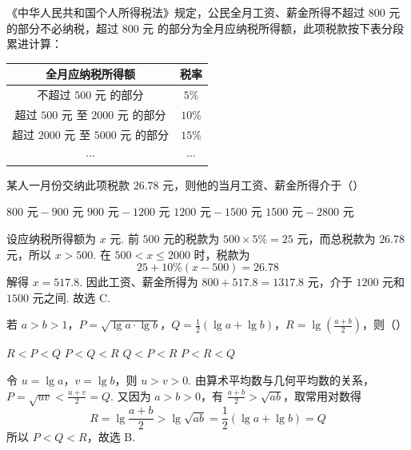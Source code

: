 \begin{problem}
《中华人民共和国个人所得税法》规定，公民全月工资、薪金所得不超过 \(800\text{ 元}\) 的部分不必纳税，超过 \(800\text{ 元}\) 的部分为全月应纳税所得额，此项税款按下表分段累进计算：

\begin{center}
\begin{tabular}{|c|c|}
\hline
全月应纳税所得额 & 税率 \\
\hline
不超过 \(500\text{ 元}\) 的部分 & \(5\%\) \\
\hline
超过 \(500\text{ 元}\) 至 \(2000\text{ 元}\) 的部分 & \(10\%\) \\
\hline
超过 \(2000\text{ 元}\) 至 \(5000\text{ 元}\) 的部分 & \(15\%\) \\
\hline
\(\cdots\) & \(\cdots\) \\
\hline
\end{tabular}
\end{center}

某人一月份交纳此项税款 \(26.78\text{ 元}\)，则他的当月工资、薪金所得介于（\quad）

\choices
    {\(800\text{ 元}-900\text{ 元}\)}
    {\(900\text{ 元}-1200\text{ 元}\)}
    {\(1200\text{ 元}-1500\text{ 元}\)}
    {\(1500\text{ 元}-2800\text{ 元}\)}


\begin{solution}
设应纳税所得额为 \(x\) 元. 前 \(500\) 元的税款为 \(500\times5\%=25\) 元，而总税款为 \(26.78\) 元，所以 \(x>500\). 在 \(500<x\leqslant2000\) 时，税款为
\[
25+10\%(x-500)=26.78
\]
解得 \(x=517.8\). 因此工资、薪金所得为 \(800+517.8=1317.8\) 元，介于 \(1200\) 元和 \(1500\) 元之间. 故选 C.
\end{solution}
\end{problem}

\begin{problem}
若 \(a>b>1\)，\(P=\sqrt{\lg a\cdot\lg b}\)，\(Q=\frac{1}{2}\left(\lg a+\lg b\right)\)，\(R=\lg\left(\frac{a+b}{2}\right)\)，则（\quad）

\choices
    {\(R<P<Q\)}
    {\(P<Q<R\)}
    {\(Q<P<R\)}
    {\(P<R<Q\)}


\begin{solution}
令 \(u=\lg a\)，\(v=\lg b\)，则 \(u>v>0\). 由算术平均数与几何平均数的关系，\(P=\sqrt{uv}<\frac{u+v}{2}=Q\). 又因为 \(a>b>0\)，有 \(\frac{a+b}{2}>\sqrt{ab}\)，取常用对数得
\[
R=\lg\frac{a+b}{2}>\lg\sqrt{ab}=\frac12(\lg a+\lg b)=Q
\]
所以 \(P<Q<R\)，故选 B.
\end{solution}
\end{problem}

